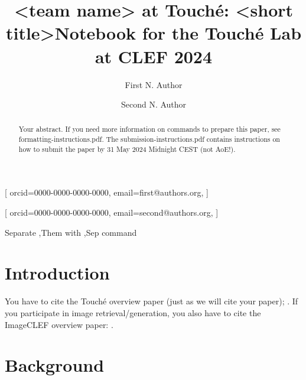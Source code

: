 \documentclass{ceurart}
\begin{document}
\title{<team name> at Touché: <short title>}
\title[mode=sub]{Notebook for the Touché Lab at CLEF 2024}

\author[1]{First N. Author}[%
orcid=0000-0000-0000-0000,
email=first@authors.org,
]
\fnmark[1]

\author[1]{Second N. Author}[%
orcid=0000-0000-0000-0000,
email=second@authors.org,
]
\fnmark[1]

\address[1]{Affiliation name, Street, City, Post code, Country}



\begin{abstract}
Your abstract. If you need more information on commands to prepare this paper, see formatting-instructions.pdf. The submission-instructions.pdf contains instructions on how to submit the paper by 31 May 2024 Midnight CEST (not AoE!).
\end{abstract}

\begin{keywords}
Separate \sep Them with \sep Sep command
\end{keywords}

\maketitle

\section{Introduction}

You have to cite the Touch{\'e} overview paper (just as we will cite your paper); \cite{kiesel:2024}. If you participate in image retrieval/generation, you also have to cite the ImageCLEF overview paper: \cite{ionescu:2024}.


\section{Background}
\end{document}
